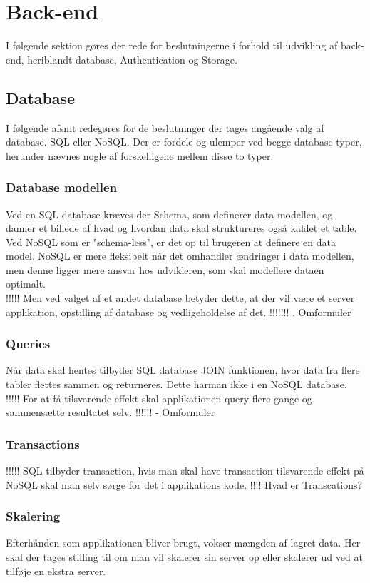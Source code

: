 \section{Back-end}
I følgende sektion gøres der rede for beslutningerne i forhold til udvikling af back-end, heriblandt database, Authentication og Storage.

\subsection{Database}
I følgende afsnit redegøres for de beslutninger der tages angående valg af database. SQL eller NoSQL.
Der er fordele og ulemper ved begge database typer, herunder nævnes nogle af forskelligene mellem disse to typer.

\subsubsection{Database modellen}
Ved en SQL database kræves der Schema, som definerer data modellen, og danner et billede af hvad og hvordan data skal struktureres også kaldet et table. Ved NoSQL som er "schema-less", er det op til brugeren at definere en data model. NoSQL er mere fleksibelt når det omhandler ændringer i data modellen, men denne ligger mere ansvar hos udvikleren, som skal modellere dataen optimalt. \\
!!!!! Men ved valget af et andet database betyder dette, at der vil være et server applikation, opstilling af database og vedligeholdelse af det. !!!!!!! . Omformuler

\subsubsection{Queries}
Når data skal hentes tilbyder SQL database JOIN funktionen, hvor data fra flere tabler flettes sammen og returneres. Dette harman ikke i en NoSQL database. \\
!!!!! For at få tilsvarende effekt skal applikationen query flere gange og sammensætte resultatet selv.  !!!!!! - Omformuler

\subsubsection{Transactions}
 !!!!! SQL tilbyder transaction, hvis man skal have transaction tilsvarende effekt på NoSQL skal man selv sørge for det i applikations kode. !!!! Hvad er Transcations?
 
\subsubsection{Skalering}
Efterhånden som applikationen bliver brugt, vokser mængden af lagret data. Her skal der tages stilling til om man vil skalerer sin server op eller skalerer ud ved at tilføje en ekstra server.  

